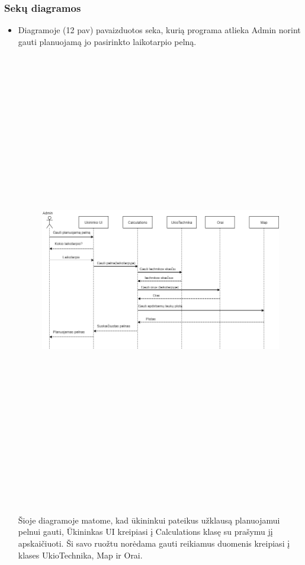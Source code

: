 \documentclass[oneside]{VUMIFPSkursinis}
\begin{document}
\subsubsection{Sekų diagramos}
\begin{itemize}
\item Diagramoje (12 pav) pavaizduotos seka, kurią programa atlieka Admin norint gauti planuojamą jo pasirinkto laikotarpio pelną.
		\begin{figure}[H]
		\centering	
	\includegraphics[width=17cm,height=20cm,keepaspectratio]{PelnoSkaičiavimas.png}
	\caption{}
	\label{fig:PelnoSkaičiavimas}
\end{figure}
Šioje diagramoje matome, kad ūkininkui pateikus užklausą planuojamui pelnui gauti, Ūkininkas UI kreipiasi į Calculations klasę su prašymu jį apskaičiuoti. Ši savo ruožtu norėdama gauti reikiamus duomenis kreipiasi į klases UkioTechnika, Map ir Orai.

\end{itemize}
\end{document}
